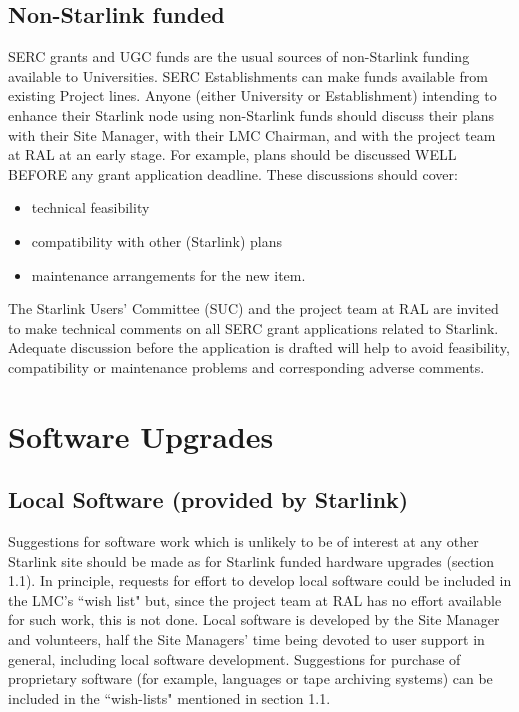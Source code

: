 \subsection{Non-Starlink funded}
SERC grants and UGC funds are the usual sources of non-Starlink funding
available to Universities.
SERC Establishments can make funds available from existing Project lines.
Anyone (either University or Establishment) intending to enhance their Starlink
node using non-Starlink funds should discuss their plans with their Site
Manager, with their LMC Chairman, and with the project team at RAL at an early
stage.
For example, plans should be discussed WELL BEFORE any grant application
deadline.
These discussions should cover:
\begin{itemize}
\item technical feasibility
\item compatibility with other (Starlink) plans
\item maintenance arrangements for the new item.
\end{itemize} 
The Starlink Users' Committee (SUC) and the project team at RAL are invited to
make technical comments on all SERC grant applications related to Starlink.
Adequate discussion before the application is drafted will help to avoid
feasibility, compatibility or maintenance problems and corresponding adverse
comments.

\section {Software Upgrades}

\subsection{Local Software (provided by Starlink)}
Suggestions for software work which is unlikely to be of interest at any other
Starlink site should be made as for Starlink funded hardware upgrades (section
1.1).
In principle, requests for effort to develop local software could be included in
the LMC's ``wish list" but, since the project team at RAL has no effort
available for such work, this is not done.
Local software is developed by the Site Manager and volunteers, half the Site
Managers' time being devoted to user support in general, including local
software development.
Suggestions for purchase of proprietary software (for example, languages
or tape archiving systems) can be included in the ``wish-lists" mentioned in
section 1.1.

